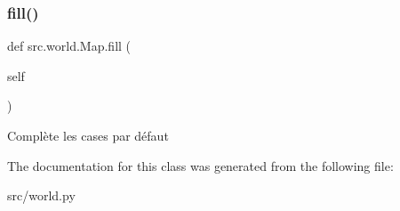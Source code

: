 \subsubsection{\texorpdfstring{fill()}{fill()}}
{\footnotesize\ttfamily def src.\+world.\+Map.\+fill (\begin{DoxyParamCaption}\item[{}]{self }\end{DoxyParamCaption})}

\begin{DoxyVerb}Complète les cases par défaut \end{DoxyVerb}
 

The documentation for this class was generated from the following file\+:\begin{DoxyCompactItemize}
\item 
src/world.\+py\end{DoxyCompactItemize}
